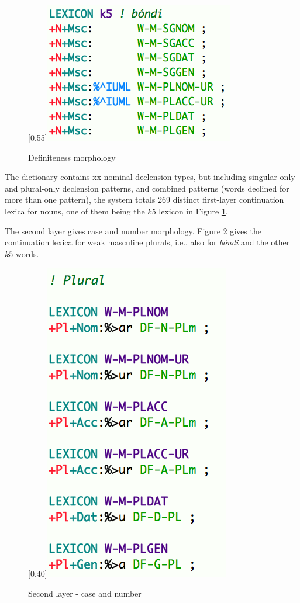 \documentclass[11pt]{article}
\begin{document}
\begin{figure}[hp]
\begin{center}
\scalebox{0.55}[0.55]{\includegraphics{img/bondi.png}}
\caption{Definiteness morphology}
\label{bondi}
\end{center}
\end{figure}

The dictionary contains xx nominal declension types, but including singular-only and plural-only declension patterns, and combined patterns (words declined for more than one pattern), the system totals 269 distinct first-layer continuation lexica for nouns, one of them being the $k5$ lexicon in Figure \ref{bondi}.

The second layer gives case and number morphology. Figure \ref{wmplnom} gives the continuation lexica for weak masculine plurals, i.e., also for \textit{bóndi} and the other $k5$ words. \\
 
\begin{figure}[hp]
\begin{center}
\scalebox{0.40}[0.40]{\includegraphics{img/wmplnom.png}}
\caption{Second layer - case and number}
\label{wmplnom}
\end{center}
\end{figure} \\
\end{document}
